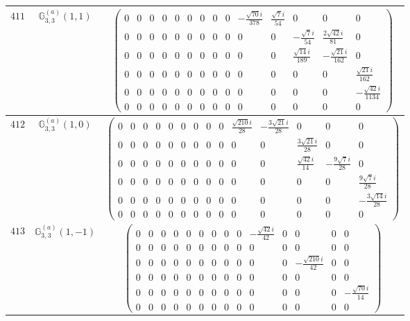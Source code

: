 \documentclass[fleqn,8pt,landscape]{jsarticle}
\begin{document}
\begin{center}
\begin{longtable}{ccc}
$ 411 $ & $ \mathbb{G}_{3,3}^{(a)}(1,1) $ & $ \begin{pmatrix} 0 & 0 & 0 & 0 & 0 & 0 & 0 & 0 & 0 & - \frac{\sqrt{70} i}{378} & \frac{\sqrt{7} i}{54} & 0 & 0 & 0 \\ 0 & 0 & 0 & 0 & 0 & 0 & 0 & 0 & 0 & 0 & 0 & - \frac{\sqrt{7} i}{54} & \frac{2 \sqrt{42} i}{81} & 0 \\ 0 & 0 & 0 & 0 & 0 & 0 & 0 & 0 & 0 & 0 & 0 & \frac{\sqrt{14} i}{189} & - \frac{\sqrt{21} i}{162} & 0 \\ 0 & 0 & 0 & 0 & 0 & 0 & 0 & 0 & 0 & 0 & 0 & 0 & 0 & \frac{\sqrt{21} i}{162} \\ 0 & 0 & 0 & 0 & 0 & 0 & 0 & 0 & 0 & 0 & 0 & 0 & 0 & - \frac{\sqrt{42} i}{1134} \\ 0 & 0 & 0 & 0 & 0 & 0 & 0 & 0 & 0 & 0 & 0 & 0 & 0 & 0 \end{pmatrix} $ \\ \hline
$ 412 $ & $ \mathbb{G}_{3,3}^{(a)}(1,0) $ & $ \begin{pmatrix} 0 & 0 & 0 & 0 & 0 & 0 & 0 & 0 & 0 & \frac{\sqrt{210} i}{28} & - \frac{3 \sqrt{21} i}{28} & 0 & 0 & 0 \\ 0 & 0 & 0 & 0 & 0 & 0 & 0 & 0 & 0 & 0 & 0 & \frac{3 \sqrt{21} i}{28} & 0 & 0 \\ 0 & 0 & 0 & 0 & 0 & 0 & 0 & 0 & 0 & 0 & 0 & \frac{\sqrt{42} i}{14} & - \frac{9 \sqrt{7} i}{28} & 0 \\ 0 & 0 & 0 & 0 & 0 & 0 & 0 & 0 & 0 & 0 & 0 & 0 & 0 & \frac{9 \sqrt{7} i}{28} \\ 0 & 0 & 0 & 0 & 0 & 0 & 0 & 0 & 0 & 0 & 0 & 0 & 0 & - \frac{3 \sqrt{14} i}{28} \\ 0 & 0 & 0 & 0 & 0 & 0 & 0 & 0 & 0 & 0 & 0 & 0 & 0 & 0 \end{pmatrix} $ \\ \hline
$ 413 $ & $ \mathbb{G}_{3,3}^{(a)}(1,-1) $ & $ \begin{pmatrix} 0 & 0 & 0 & 0 & 0 & 0 & 0 & 0 & 0 & - \frac{\sqrt{42} i}{42} & 0 & 0 & 0 & 0 \\ 0 & 0 & 0 & 0 & 0 & 0 & 0 & 0 & 0 & 0 & 0 & 0 & 0 & 0 \\ 0 & 0 & 0 & 0 & 0 & 0 & 0 & 0 & 0 & 0 & 0 & - \frac{\sqrt{210} i}{42} & 0 & 0 \\ 0 & 0 & 0 & 0 & 0 & 0 & 0 & 0 & 0 & 0 & 0 & 0 & 0 & 0 \\ 0 & 0 & 0 & 0 & 0 & 0 & 0 & 0 & 0 & 0 & 0 & 0 & 0 & - \frac{\sqrt{70} i}{14} \\ 0 & 0 & 0 & 0 & 0 & 0 & 0 & 0 & 0 & 0 & 0 & 0 & 0 & 0 \end{pmatrix} $ \\ \hline

\end{longtable}
\end{center}
\end{document}

